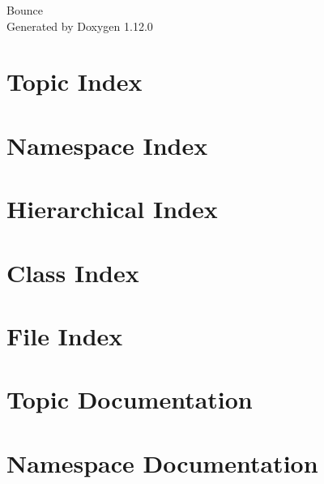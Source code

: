 \documentclass[twoside]{book}
\newcommand{\+}{\discretionary{\mbox{\scriptsize$\hookleftarrow$}}{}{}}
\newcommand{\clearemptydoublepage}{%
    \newpage{\pagestyle{empty}\cleardoublepage}%
  }
\begin{document}
  \raggedbottom
    \hypersetup{pageanchor=false,
                bookmarksnumbered=true,
                pdfencoding=unicode
               }
  \begin{titlepage}
  \vspace*{7cm}
  \begin{center}%
  {\Large Bounce}\\
  \vspace*{1cm}
  {\large Generated by Doxygen 1.12.0}\\
  \end{center}
  \end{titlepage}
  \clearemptydoublepage
  \tableofcontents
  \clearemptydoublepage
  \hypersetup{pageanchor=true}

\chapter{Topic Index}

\chapter{Namespace Index}

\chapter{Hierarchical Index}

\chapter{Class Index}

\chapter{File Index}

\chapter{Topic Documentation}





\chapter{Namespace Documentation}

\end{document}
